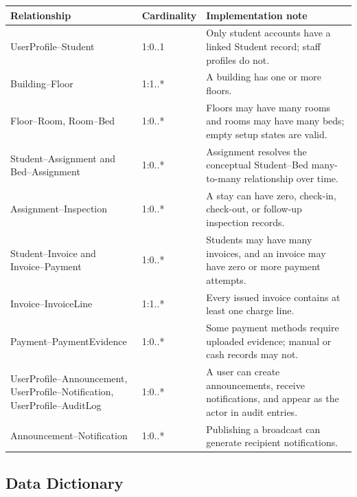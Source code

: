 \documentclass[11pt,a4paper]{article}
\begin{document}
\begin{longtable}{L{0.34\textwidth} L{0.18\textwidth} L{0.36\textwidth}}
\toprule
\textbf{Relationship} & \textbf{Cardinality} & \textbf{Implementation note}\\
\midrule
\endhead
UserProfile--Student & 1:0..1 & Only student accounts have a linked Student record; staff profiles do not.\\
Building--Floor & 1:1..* & A building has one or more floors.\\
Floor--Room, Room--Bed & 1:0..* & Floors may have many rooms and rooms may have many beds; empty setup states are valid.\\
Student--Assignment and Bed--Assignment & 1:0..* & Assignment resolves the conceptual Student--Bed many-to-many relationship over time.\\
Assignment--Inspection & 1:0..* & A stay can have zero, check-in, check-out, or follow-up inspection records.\\
Student--Invoice and Invoice--Payment & 1:0..* & Students may have many invoices, and an invoice may have zero or more payment attempts.\\
Invoice--InvoiceLine & 1:1..* & Every issued invoice contains at least one charge line.\\
Payment--PaymentEvidence & 1:0..* & Some payment methods require uploaded evidence; manual or cash records may not.\\
UserProfile--Announcement, UserProfile--Notification, UserProfile--AuditLog & 1:0..* & A user can create announcements, receive notifications, and appear as the actor in audit entries.\\
Announcement--Notification & 1:0..* & Publishing a broadcast can generate recipient notifications.\\
\bottomrule
\end{longtable}

\subsection{Data Dictionary}
\end{document}

